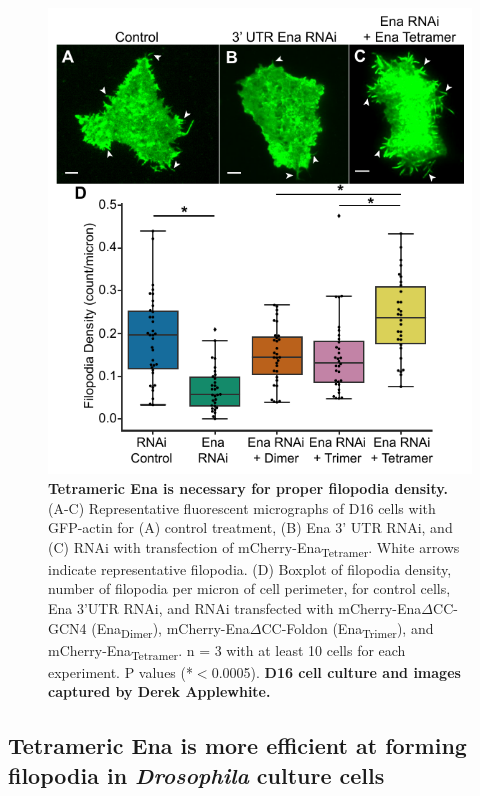 \begin{figure}
\centering
\includegraphics[width=5in]{img/ch02/Figure_4_elife.pdf}
\caption[Tetrameric Ena is necessary for proper filopodia density.]{\textbf{Tetrameric Ena is necessary for proper filopodia density.} (A-C) Representative fluorescent micrographs of D16 cells with GFP-actin for (A) control treatment, (B) Ena 3' UTR RNAi, and (C) RNAi with transfection of mCherry-Ena\textsubscript{Tetramer}. White arrows indicate representative filopodia. (D) Boxplot of filopodia density, number of filopodia per micron of cell perimeter, for control cells, Ena 3'UTR RNAi, and RNAi transfected with mCherry-Ena$\Delta$CC-GCN4 (Ena\textsubscript{Dimer}), mCherry-Ena$\Delta$CC-Foldon (Ena\textsubscript{Trimer}), and mCherry-Ena\textsubscript{Tetramer}. n = 3 with at least 10 cells for each experiment. P values (*$<$0.0005). \textbf{D16 cell culture and images captured by Derek Applewhite.}}
\label{fig:ena-cells}
\end{figure}

\subsection{Tetrameric Ena is more efficient at forming filopodia in \textit{Drosophila} culture cells}\label{ena-fly-cells}

